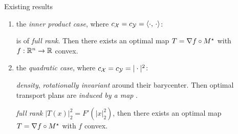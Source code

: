 \documentclass[9pt,xcolor={dvipsnames}]{beamer}
\begin{document}
\begin{frame}{Existing results}
    \begin{enumerate}
        \item the \emph{inner product case}, where $c_{\mathcal{X}}=c_{\mathcal{Y}}=\langle\cdot,\,\cdot\rangle$:
            \begin{block}{\cite{vayer2020contribution}}
                     is of \emph{full rank}. Then there exists an optimal map $T=\nabla f\circ M^\star$ with $f: \mathbb{R}^n \to \mathbb{R}$ convex.
            \end{block}
            \item the \emph{quadratic case}, where $c_{\mathcal{X}}=c_{\mathcal{Y}}=|\cdot|^2$:
            \begin{block}{\cite{sturm2012space}}
                 \emph{density}, \emph{rotationally invariant} around their barycenter. Then optimal transport plans are \emph{induced by a map} .
            \end{block}
            \begin{block}{\cite{vayer2020contribution}}
                 \emph{full rank}  \emph{$|T(x)|_2^2=F'(|x|^2_2)$}, then there exists an optimal map $T=\nabla f \circ M^\star$ with $f$ convex.
            \end{block}
        \end{enumerate}
\end{frame}
\end{document}
